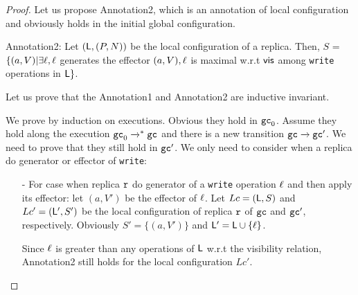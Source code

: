 \begin {proof}
Let us propose Annotation2, which is an annotation of local configuration and obviously holds in the initial global configuration.


\noindent Annotation2: Let $(\mathsf{L},(P,N))$ be the local configuration of a replica. Then, $S$ =  $\{ (a,V) \vert \exists \ell, \ell$ generates the effector $(a,V), \ell$ is maximal w.r.t $\mathsf{vis}$ among {\tt write} operations in $\mathsf{L} \}$.



Let us prove that the Annotation1 and Annotation2 are inductive invariant.

We prove by induction on executions. Obvious they hold in $\mathtt{gc}_0$. Assume they hold along the execution $\mathtt{gc}_0 \xrightarrow{}^* \mathtt{gc}$ and there is a new transition $\mathtt{gc} \xrightarrow{} \mathtt{gc}'$. We need to prove that they still hold in $\mathtt{gc}'$. We only need to consider when a replica do generator or effector of {\tt write}:

\begin{itemize}
\setlength{\itemsep}{0.5pt}
\item[-] For case when replica $\mathtt{r}$ do generator of a {\tt write} operation $\ell$ and then apply its effector: let $(a,V')$ be the effector of $\ell$. %
    Let $Lc = (\mathsf{L},S)$ and $Lc' = (\mathsf{L}',S')$ be the local configuration of replica $\mathtt{r}$ of $\mathtt{gc}$ and $\mathtt{gc}'$, respectively. Obviously $S' = \{ (a,V') \}$ and $\mathsf{L}' = \mathsf{L} \cup \{ \ell \}$. 

    Since $\ell$ is greater than any operations of $\mathsf{L}$ 
    w.r.t the visibility relation, Annotation2 still holds for the local configuration $Lc'$. %



\end{itemize}
\end{proof}
